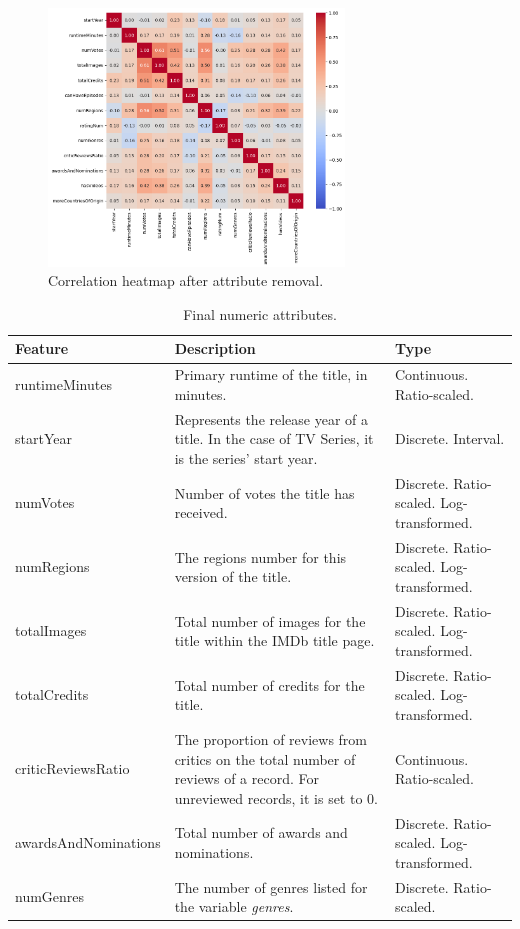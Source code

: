 \begin{figure}
    \centering
    \includegraphics[width=0.7\textwidth]{../../results/images/heatmap_second.png}
    \caption{Correlation heatmap after attribute removal.}
    \label{fig:heatmap_second.png}
\end{figure}

\begin{table}[h]
    \centering
    \renewcommand{\arraystretch}{1.2}
    \scriptsize
    \begin{tabular}{|p{3cm}|p{6cm}|p{3cm}|} 
    \hline
    \textbf{Feature} & \textbf{Description} & \textbf{Type} \\ \hline
    runtimeMinutes & Primary runtime of the title, in minutes. & Continuous. Ratio-scaled. \\ \hline
    startYear & Represents the release year of a title. In the case of TV Series, it is the series’ start year. & Discrete. Interval. \\ \hline
    numVotes & Number of votes the title has received. & Discrete. Ratio-scaled. Log-transformed. \\ \hline
    numRegions & The regions number for this version of the title. & Discrete. Ratio-scaled. Log-transformed. \\ \hline
    totalImages & Total number of images for the title within the IMDb title page. & Discrete. Ratio-scaled. Log-transformed. \\ \hline
    totalCredits & Total number of credits for the title. & Discrete. Ratio-scaled. Log-transformed. \\ \hline
    criticReviewsRatio & The proportion of reviews from critics on the total number of reviews of a record. For unreviewed records, it is set to 0. & Continuous. Ratio-scaled. \\ \hline
    awardsAndNominations & Total number of awards and nominations. & Discrete. Ratio-scaled. Log-transformed. \\ \hline
    numGenres & The number of genres listed for the variable \textit{genres}. & Discrete. Ratio-scaled. \\ \hline
    \end{tabular}
    \caption{Final numeric attributes.}
    \label{tab:dataset_numeric}
\end{table}


